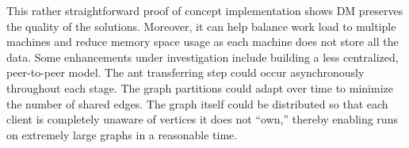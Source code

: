 \documentclass[11pt]{article}
\begin{document}
This rather straightforward proof of concept implementation shows DM preserves the quality of the solutions. Moreover, it can help  balance work load to multiple machines and reduce memory space usage as each machine does not store all the data. Some enhancements under investigation include building a less centralized, peer-to-peer model.  The ant transferring step could occur asynchronously throughout each stage. The graph partitions could adapt over time to minimize the number of shared edges.  The graph itself could be distributed so that each client is completely unaware of vertices it does not ``own,'' thereby enabling runs on extremely large graphs in a reasonable time.









\end{document}
